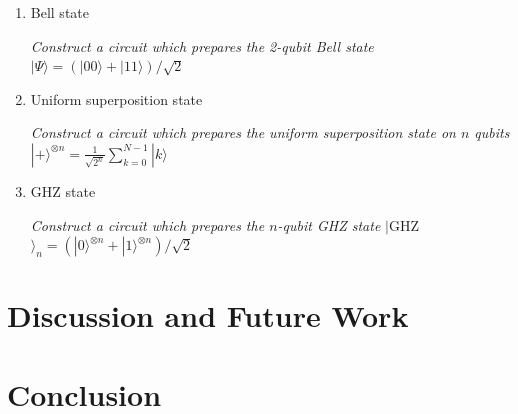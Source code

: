 \documentclass[letterpaper]{article} %
\begin{document}
\begin{enumerate}

\item Bell state

      \textit{Construct a circuit which prepares the 2-qubit Bell state
              $|\Psi\rangle=(|00\rangle+|11\rangle)/\sqrt{2}$}

\item Uniform superposition state

      \textit{Construct a circuit which prepares the uniform superposition
              state on $n$ qubits
              $|+\rangle^{\otimes n}=\frac{1}{\sqrt{2^n}} \sum_{k=0}^{N-1} |k\rangle$}

\item GHZ state

      \textit{Construct a circuit which prepares the $n$-qubit GHZ state}
              $|$GHZ$\rangle_n=(|0\rangle^{\otimes n}+|1\rangle^{\otimes n})/\sqrt{2}$

\end{enumerate}



\section{Discussion and Future Work}




\section{Conclusion}



\end{document}

